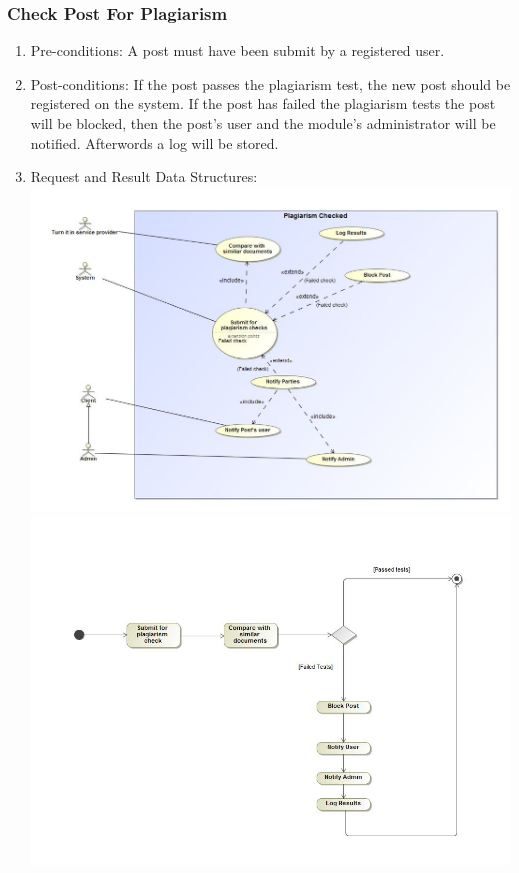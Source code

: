 \documentclass[12pt, oneside]{article}
\begin{document}
\subsubsection{Check Post For Plagiarism}
\begin{enumerate}
 \item Pre-conditions: A post must have been submit by a registered user. 
 \\
 
 \item Post-conditions: If the post passes the plagiarism test, the new post should be registered on the system. If the post has failed the plagiarism tests the post will be blocked, then the post's user and the module's administrator will be notified. Afterwords a log will be stored. 
   \\
 \item Request and Result Data Structures:\\
  \includegraphics[scale=0.4]{plagiarismCheckUC}\\
 \includegraphics[scale=0.35]{plagiarismCheckAD} 
\end{enumerate}
\end{document}
